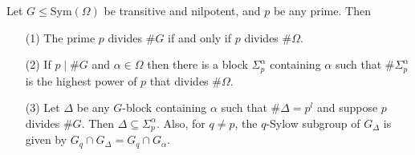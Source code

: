 \documentclass{llncs}
\newcommand{\Sym}[1]{{\ensuremath{\mathrm{Sym}\left(#1\right)}}}
\begin{document}
\begin{lemma}\label{lem-struct-nilpotent}
  Let $G\leq\Sym{\Omega}$ be transitive and nilpotent, and $p$ be any
  prime. Then
  \begin{enumerate}
  \item[(1)] The prime $p$ divides $\#G$ if and only if $p$ divides
    $\# \Omega$.\label{lem-struct-nilpotent-ps}
  \item[(2)] If $p \mid \# G$ and $\alpha \in \Omega$ then there is a
    block $\Sigma_p^\alpha$ containing $\alpha$ such that $\#
    \Sigma_p^\alpha$ is the highest power of $p$ that divides $\#
    \Omega$.\label{lem-struct-nilpotent-sigma}
  \item[(3)] Let $\Delta$ be any $G$-block containing $\alpha$ such
    that $\# \Delta = p^l$ and suppose $p$ divides $\# G$. Then
    $\Delta \subseteq \Sigma_p^\alpha$. Also, for $q\neq p$, the
    $q$-Sylow subgroup of $G_\Delta$ is given by $G_q \cap G_\Delta =
    G_q \cap G_\alpha$.
  \end{enumerate}
\end{lemma}
\end{document}
